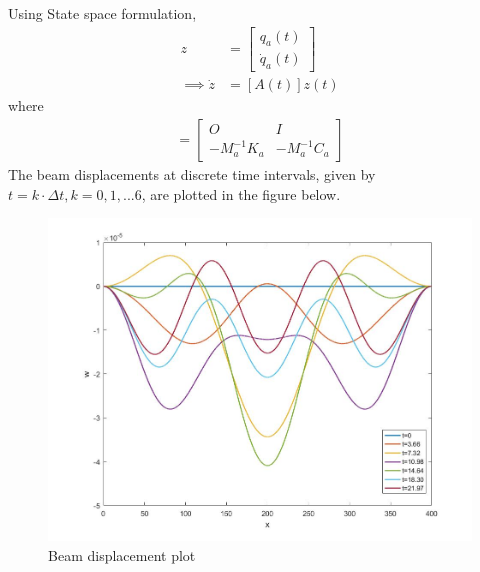 \documentclass[11pt, oneside]{article}   	%
\begin{document}
\noindent Using State space formulation, 
\begin{align}
 z &= \begin{bmatrix}
q_a(t) \\
\dot{q}_a(t)
\end{bmatrix} \\
\implies \dot{z} &= [A(t)] z(t)
\end{align}
where 
\begin{align}
[A(t)] = \begin{bmatrix}
O & I \\
-M_a^{-1} K_a & -M_a^{-1} C_a
\end{bmatrix}
\end{align}
The beam displacements at discrete time intervals, given by $t=k \cdot \Delta t, k=0,1,...6$, are plotted in the figure below.
\begin{figure}[!htbp]
	\centering
	\includegraphics[scale=0.3]{BeamDisp}
	\caption{Beam displacement plot}
\end{figure}
\end{document}
